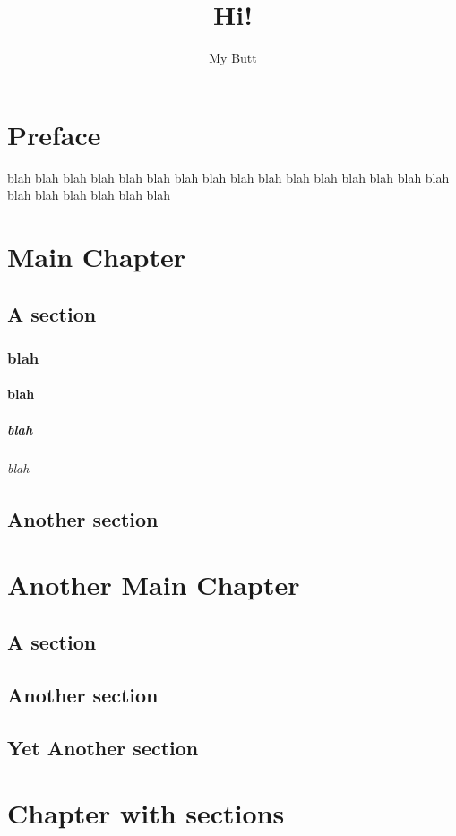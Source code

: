 \documentclass{MUthesis}
\title{Hi!}
\author{My Butt}
\begin{document}
\tableofcontents

\chapter{Preface}
blah blah
blah blah
blah blah
blah blah
blah blah
blah blah
blah blah
blah blah
blah blah
blah blah
blah blah
\mainmatter

\chapter{Main Chapter}
\section{A section}
\subsection{blah}
\subsubsection{blah}
\paragraph{blah}
\subparagraph{blah}
\section{Another section}
\chapter{Another Main Chapter}
\section{A section}
\section{Another section}
\section{Yet Another section}

\chapter{Chapter with sections}
\end{document}
